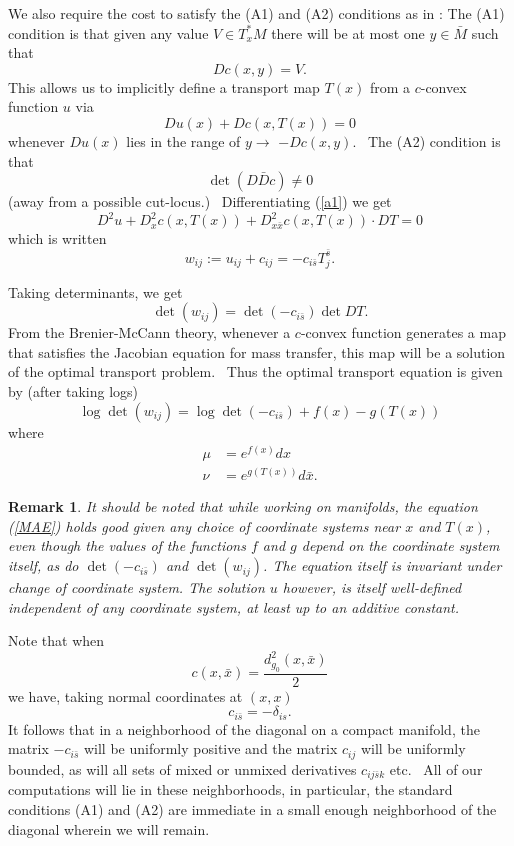 \documentclass[11pt,letterpaper]{amsart}%
\newtheorem{remark}[theorem]{Remark}
\numberwithin{equation}{section}
\begin{document}
We also require the cost to satisfy the (A1) and (A2) conditions as  in \cite{MTW}: The (A1) condition is that given any value $V\in T_{x}^{\ast}M$ there will be
at most one $y\in\bar{M}$ such that
\[
Dc(x,y)=V.
\]
This allows us to implicitly define a transport map $T(x)$ from a $c$-convex
function $u$ via
\begin{equation}
Du(x)+Dc\left(  x,T(x)\right)  =0 \label{a1}%
\end{equation}
whenever $Du(x)$ lies in the range of $y\rightarrow$ $-Dc(x,y).$ \ The (A2)
condition is that
\[
\det(D\bar{D}c)\neq0
\]
(away from a possible cut-locus.) \ Differentiating (\ref{a1}) we get
\[
D^{2}u+D_{x}^{2}c(x,T(x))+D_{x\bar{x}}^{2}c(x,T(x))\cdot DT=0
\]
which is written
\begin{equation}
w_{ij}:=u_{ij}+c_{ij}=-c_{i\bar{s}}T_{j}^{\bar{s}}.\label{asab}%
\end{equation}

Taking determinants, we get
\[
\det\left(  w_{ij}\right)  =\det(-c_{i \bar{s}})\det DT.
\]
From the  Brenier-McCann theory, whenever a $c$-convex function
generates a map that satisfies the Jacobian equation for mass transfer, this
map will be a solution of the optimal transport problem. \ Thus the optimal
transport equation is given by (after taking logs)\
\begin{equation}
\log\det\left(  w_{ij}\right)  =\log\det(-c_{i\bar{s}})+f(x)-g(T(x))
\label{MAE}%
\end{equation}
where
\begin{align*}
\mu &  =e^{f(x)}dx\\
\nu &  =e^{g(T(x))}d\bar{x}.
\end{align*}
\begin{remark}
It should be noted that while working on manifolds, the equation (\ref{MAE}) holds good
given any choice of coordinate systems near $x$ and $T(x)$, even though the
values of the functions $f$ and $g$ depend on the coordinate system itself, as
do $\det(-c_{i\bar{s}})$ and $\det(w_{ij})$.  The equation itself is invariant under change of
coordinate system. The solution $u$ however, is itself well-defined independent of any coordinate system, at least up to an additive constant. 
\end{remark}
Note that when%
\[
c(x, \bar{x}) =\frac{d_{g_{0}}^{2}(x,\bar{x})}{2}%
\]
we have, taking normal coordinates at $\left(  x,x\right)  $
\[
c_{i\bar{s}}=-\delta_{is}.%
\]
It follows that in a neighborhood of the diagonal on a compact manifold, the matrix $-c_{i\bar{s}}$ will be uniformly
positive and the matrix $c_{ij}$ will be uniformly bounded, as will all sets of
mixed or unmixed derivatives $c_{ij\bar{s}k}$ etc. \ All of our computations
will lie in these neighborhoods, in particular, the standard conditions (A1)
and (A2) are immediate in a small enough neighborhood of the diagonal wherein
we will remain. \ 
\end{document}
